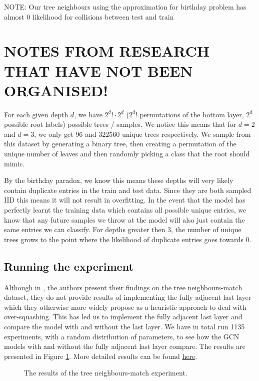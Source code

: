 \documentclass[a4paper,12pt]{article}
\begin{document}
NOTE:
Our tree neighbours using the approximation for birthday problem has almost 0 likelihood for collisions between test and train


\section{NOTES FROM RESEARCH THAT HAVE NOT BEEN ORGANISED!}

For each given depth $d$, we have $2^{d}! \cdot 2^{d}$ ($2^{d}!$ permutations of the bottom layer, $2^{d}$ possible root labels) possible trees / samples. We notice this means that for $d=2$ and $d=3$, we only get $96$ and $322560$ unique trees respectively.
We sample from this dataset by generating a binary tree, then creating a permutation of the unique number of leaves and then randomly picking a class that the root should mimic.

By the birthday paradox, we know this means these depths will very likely contain duplicate entries in the train and test data. Since they are both sampled IID this means it will not result in overfitting. In the event that the model has perfectly learnt the training data which contains all possible unique entries, we know that any future samples we throw at the model will also just contain the same entries we can classify.
For depths greater then 3, the number of unique trees grows to the point where the likelihood of duplicate entries goes towards 0.


\subsection{Running the experiment} %

Although in \cite{alon_bottleneck_2021}, the authors present their findings on the tree neighbours-match dataset, they do not provide results of implementing the fully adjacent last layer which they otherwise more widely propose as a heuristic approach to deal with over-squashing.
This has led us to implement the fully adjacent last layer and compare the model with and without the last layer. We have in total run 1135 experiments, with a random distribution of parameters, to see how the GCN models with and without the fully adjacent last layer compare. The results are presented in Figure \ref{fig:tree_experiment_graph}. More detailed results can be found \href{PLACE SOMETHING HERE MAYBE A LINK TO THE RESULTS IN THE}{here}.

\begin{figure}[H]
  \centering
  
  \caption{The results of the tree neighbours-match experiment.}
  \label{fig:tree_experiment_graph}
\end{figure}
\end{document}
